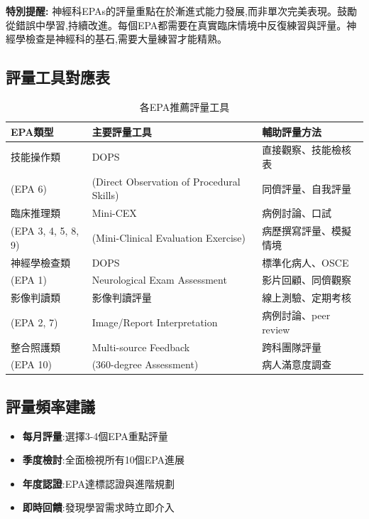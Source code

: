 \documentclass[12pt,a4paper]{article}
\begin{document}
\begin{importantbox}
\textbf{特別提醒:} 神經科EPAs的評量重點在於漸進式能力發展,而非單次完美表現。鼓勵從錯誤中學習,持續改進。每個EPA都需要在真實臨床情境中反復練習與評量。神經學檢查是神經科的基石,需要大量練習才能精熟。
\end{importantbox}

\subsection{評量工具對應表}
\begin{table}[h]
    \centering
    \caption{各EPA推薦評量工具}
    \begin{tabular}{p{4.5cm} p{4cm} p{5.5cm}}
        \toprule
        \textbf{EPA類型} & \textbf{主要評量工具} & \textbf{輔助評量方法} \\
        \midrule
        技能操作類 & DOPS & 直接觀察、技能檢核表 \\
        (EPA 6) & (Direct Observation of Procedural Skills) & 同儕評量、自我評量 \\
        \midrule
        臨床推理類 & Mini-CEX & 病例討論、口試 \\
        (EPA 3, 4, 5, 8, 9) & (Mini-Clinical Evaluation Exercise) & 病歷撰寫評量、模擬情境 \\
        \midrule
        神經學檢查類 & DOPS & 標準化病人、OSCE \\
        (EPA 1) & Neurological Exam Assessment & 影片回顧、同儕觀察 \\
        \midrule
        影像判讀類 & 影像判讀評量 & 線上測驗、定期考核 \\
        (EPA 2, 7) & Image/Report Interpretation & 病例討論、peer review \\
        \midrule
        整合照護類 & Multi-source Feedback & 跨科團隊評量 \\
        (EPA 10) & (360-degree Assessment) & 病人滿意度調查 \\
        \bottomrule
    \end{tabular}
\end{table}

\subsection{評量頻率建議}
\begin{itemize}[nosep]
    \item \textbf{每月評量}:選擇3-4個EPA重點評量
    \item \textbf{季度檢討}:全面檢視所有10個EPA進展
    \item \textbf{年度認證}:EPA達標認證與進階規劃
    \item \textbf{即時回饋}:發現學習需求時立即介入
\end{itemize}
\end{document}
